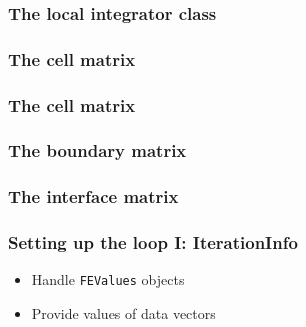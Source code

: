 \begin{frame}
  \frametitle{The local integrator class}
  \begin{block}{}\small
    
  \end{block}
\end{frame}

\begin{frame}[t]
  \frametitle{The cell matrix}
  \begin{block}{}\footnotesize
    
  \end{block}
\end{frame}

\begin{frame}[t]
  \frametitle{The cell matrix}
  \begin{block}{}\small
    
  \end{block}
\end{frame}

\begin{frame}
  \frametitle{The boundary matrix}
  \begin{block}{}\footnotesize
    
  \end{block}
\end{frame}

\begin{frame}
  \frametitle{The interface matrix}
  \begin{block}{}\footnotesize
    
  \end{block}
\end{frame}

\begin{frame}
  \frametitle{Setting up the loop I: IterationInfo}
  \begin{itemize}
  \item<1-> Handle \texttt{FEValues} objects
  \item<2-> Provide values of data vectors
  \end{itemize}
\end{frame}

